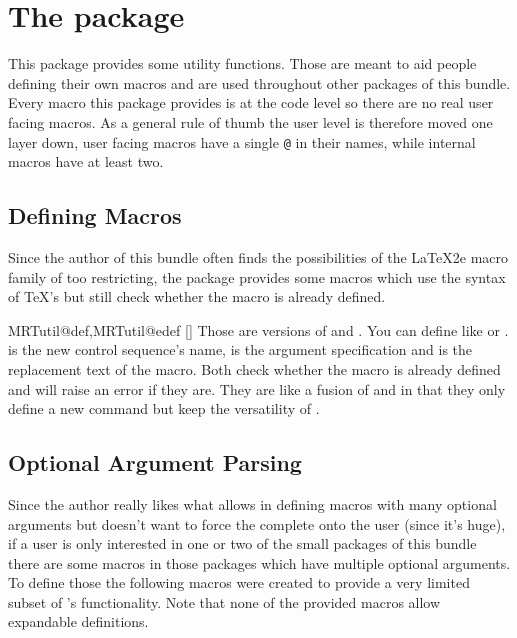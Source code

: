 \chapter{The  package}\label{sec:util}
This package provides some utility functions. Those are meant to aid people
defining their own macros and are used throughout other packages of this bundle.
Every macro this package provides is at the code level so there are no real user
facing macros. As a general rule of thumb the user level is therefore moved one
layer down, user facing macros have a single \texttt{@} in their names, while
internal macros have at least two.

\section{Defining Macros}
Since the author of this bundle often finds the possibilities of the \LaTeX2e
macro family of  too restricting, the package provides some
macros which use the syntax of \TeX's  but still check whether the macro
is already defined.

\begin{describemacro}{MRTutil@def,MRTutil@edef}%
  []
  Those are versions of  and . You can define 
  like  or .  is the new control sequence's
  name,  is the argument specification and  is the
  replacement text of the macro. Both check whether the macro is already defined
  and will raise an error if they are. They are like a fusion of 
  and  in that they only define a new command but keep the versatility
  of .
\end{describemacro}

\section{Optional Argument Parsing}
Since the author really likes what  allows in defining macros with
many optional arguments but doesn't want to force the complete  onto
the user (since it's huge), if a user is only interested in one or two of the
small packages of this bundle there are some macros in those packages which have
multiple optional arguments. To define those the following macros were created
to provide a very limited subset of 's functionality. Note that none
of the provided macros allow expandable definitions.


